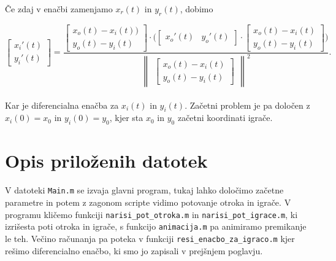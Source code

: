 \documentclass[mat1,reqno]{fmfdelo}
\begin{document}
Če zdaj v enačbi zamenjamo $x_{r}(t)$ in $y_{r}(t)$, dobimo

\begin{equation*}
\begin{bmatrix}
	x_{i}'(t) \\
	y_{i}'(t)
\end{bmatrix} = \frac{
\begin{bmatrix}
	x_{o}(t) - x_{i}(t)) \\
	y_{o}(t) - y_{i}(t)
\end{bmatrix}
\cdot
\Big(
\begin{bmatrix}
	x_{o}'(t) & y_{o}'(t)
\end{bmatrix}
\cdot
\begin{bmatrix}
	x_{o}(t) - x_{i}(t) \\
	y_{o}(t) - y_{i}(t)
\end{bmatrix}
\Big)
}{
\begin{Vmatrix}
\begin{bmatrix}
	x_{o}(t) - x_{i}(t) \\
	y_{o}(t) - y_{i}(t)
\end{bmatrix}
\end{Vmatrix}^2
}.
\end{equation*}
\\

Kar je diferencialna enačba za $x_{i}(t)$ in $y_{i}(t)$. Začetni problem je pa določen z $x_{i}(0) = x_{0}$ in $y_{i}(0) = y_{0}$, kjer sta $x_{0}$ in $y_{0}$ začetni koordinati igrače.


\section{Opis priloženih datotek}

V datoteki {\texttt{Main.m}} se izvaja glavni program, tukaj lahko določimo začetne parametre in potem z zagonom scripte vidimo potovanje otroka in igrače. V programu kličemo funkciji {\texttt{narisi\_pot\_otroka.m}} in {\texttt{narisi\_pot\_igrace.m}}, ki izrišesta poti otroka in igrače, s funkcijo {\texttt{animacija.m}} pa animiramo premikanje le teh. Večino računanja pa poteka v funkciji {\texttt{resi\_enacbo\_za\_igraco.m}} kjer rešimo diferencialno enačbo, ki smo jo zapisali v prejšnjem poglavju.

\end{document}
